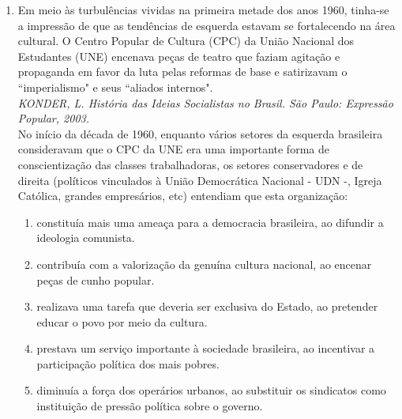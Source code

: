 \documentclass[10pt,a4paper]{article}
\begin{document}
\begin{multicols}{2}
\begin{enumerate}
	\item  Em meio às turbulências vividas na primeira metade dos anos 1960, tinha-se a impressão de que 
as tendências de esquerda estavam se fortalecendo na área cultural. O Centro Popular de Cultura (CPC) da União Nacional dos Estudantes (UNE) encenava peças de teatro que faziam agitação e propaganda em favor da luta pelas reformas de base e satirizavam  o ``imperialismo" e seus ``aliados internos". \\
	\emph{KONDER, L. História das Ideias Socialistas no Brasil. São Paulo: Expressão Popular, 2003.}\\
	No início da década de 1960, enquanto vários setores da esquerda brasileira consideravam 
que o CPC da UNE era uma importante forma de conscientização das classes trabalhadoras, 
os setores conservadores e de direita (políticos vinculados à União Democrática Nacional - UDN -, 
Igreja Católica, grandes empresários, etc) entendiam que esta organização:
		\begin{enumerate}
		\item constituía mais uma ameaça para a democracia brasileira, ao difundir a ideologia comunista.
		\item contribuía com a valorização da genuína cultura nacional, ao encenar peças de cunho popular.
		\item realizava uma tarefa que deveria ser exclusiva do Estado, ao pretender educar o povo por meio da cultura.
		\item prestava um serviço importante à sociedade brasileira, ao incentivar a participação política dos 
mais pobres.
		\item diminuía a força dos operários urbanos, ao substituir os sindicatos como instituição de pressão política sobre o governo.
		\end{enumerate}



\end{enumerate}
\end{multicols}
\end{document}
